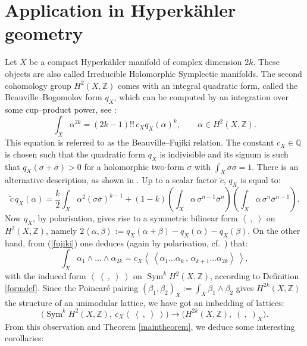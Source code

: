 \documentclass{amsart}
\DeclareMathOperator{\Sym}{Sym}
\newcommand{\coloneqq}{:=}
\newcommand{\bra}{\left<\!\!\!\:\left<}
\newcommand{\ket}{\right>\!\!\!\:\right>}
\newcommand{\Q}{\mathbb{Q}}
\newcommand{\Z}{\mathbb{Z}}
\theoremstyle{plain}
\theoremstyle{definition}
\theoremstyle{remark}
\begin{document}
\section{Application in Hyperk\"ahler geometry} \label{hyper}
Let $X$ be a compact Hyperk\"ahler manifold of complex dimension $2k$. These objects are also called Irreducible Holomorphic Symplectic manifolds. The second cohomology group $H^2(X,\Z)$ comes with an integral quadratic form, called the Beauville--Bogomolov form $q_X$, which can be computed by an integration over some cup--product power, see \cite[Subsection~2.3]{OGrady}:
\begin{equation} \label{fujiki}
\int_X \alpha ^{2k} = (2k-1)!!\,c_X q_X(\alpha)^k,\qquad \alpha\in H^2(X,\Z).
\end{equation}
This equation is referred to as the Beauville--Fujiki relation. The constant $c_X\in\Q$ is chosen such that the quadratic form $q_X$ is indivisible and its signum is such that $q_X(\sigma + \bar{\sigma}) > 0$ for a holomorphic two-form $\sigma$ with $\int_X\sigma\bar{\sigma} = 1$. There is an alternative description, as shown in \cite[Chap.~23]{Huybrechts}. Up to a scalar factor $\tilde{c}$, $q_X$ is equal to:
\begin{equation}\label{bb}
 \tilde{c}\,q_X(\alpha) = \frac{k}{2}\int_X \alpha^2 (\sigma\bar{\sigma})^{k-1} + (1-k)\left(\int_X\alpha\,\sigma^{n-1}\bar{\sigma}^{n}\right)\left(\int_X\alpha\,\sigma^{n}\bar{\sigma}^{n-1}\right).
\end{equation}
Now $q_X$, by polarisation, gives rise to a symmetric bilinear form $\left<\ ,\;\right>$ on $H^2(X,\Z)$, namely $2\left<\alpha,\beta\right> \coloneqq q_X(\alpha+\beta)-q_X(\alpha) -q_X(\beta)$. On the other hand, from (\ref{fujiki}) one deduces (again by polarisation, cf.~\cite[Eq.~3.2.4]{OGrady}) that:
\begin{equation}
 \int_X \alpha_1\wedge\ldots\wedge\alpha_{2k} = c_X \bra \alpha_1\ldots\alpha_k\,,\,\alpha_{k+1}\ldots\alpha_{2k}\ket,
\end{equation}
with the induced form $\bra\ ,\;\ket$ on $\Sym^kH^2(X,\Z)$, according to Definition \ref{formdef}. Since the Poincar\'e pairing $(\beta_1,\beta_2)_X \coloneqq \int_X\beta_1\wedge\beta_2$ gives $H^{2k}(X,\Z)$ the structure of an unimodular lattice, we have got an imbedding of lattices:
\begin{equation}
\Big( \Sym^kH^2(X,\Z),\: c_X\!\bra\ ,\;\ket\Big) \longrightarrow \Big(H^{2k}(X,\Z),\;(\ ,\;)_X\Big).
\end{equation}
From this observation and Theorem \ref{maintheorem}, we deduce some interesting corollaries:
\end{document}
